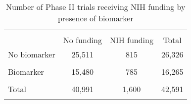 \begin{table}[htbp]\centering
\def\sym#1{\ifmmode^{#1}\else\(^{#1}\)\fi}
\caption{Number of Phase II trials receiving NIH funding by presence of biomarker}
\begin{tabular}{l*{3}{c}}
\hline\hline
                &\multicolumn{3}{c}{}                                    \\
                &No funding         &NIH funding         &    Total         \\
\hline
No biomarker    &   25,511         &      815         &   26,326         \\
                &                  &                  &                  \\
[1em]
Biomarker       &   15,480         &      785         &   16,265         \\
                &                  &                  &                  \\
[1em]
Total           &   40,991         &    1,600         &   42,591         \\
                &                  &                  &                  \\
\hline\hline
\end{tabular}
\end{table}
